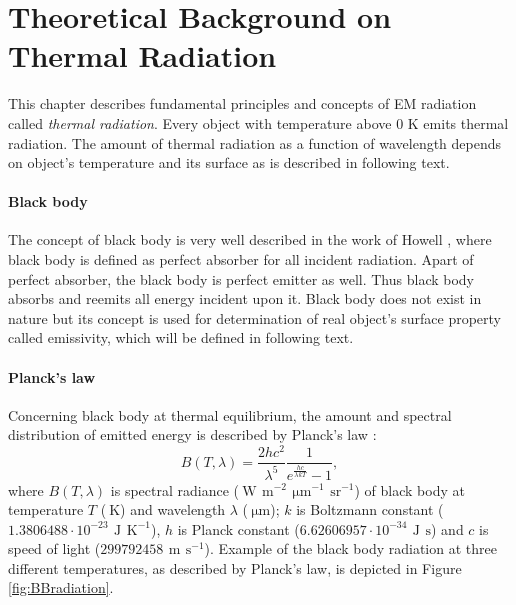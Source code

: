 \chapter{Theoretical Background on Thermal Radiation}
\label{chap:TheoreticalBackground}

This chapter describes fundamental principles and concepts of EM radiation called \textit{thermal radiation}. Every object with temperature above 0 K emits thermal radiation. The amount of thermal radiation as a function of wavelength depends on object's temperature and its surface as is described in following text.

\subsubsection*{Black body}
The concept of black body is very well described in the work of Howell \cite{H11}, where black body is defined as perfect absorber for all incident radiation. Apart of perfect absorber, the black body is perfect emitter as well. Thus black body absorbs and reemits all energy incident upon it. Black body does not exist in nature but its concept is used for determination of real object's surface property called emissivity, which will be defined in following text. 

\subsubsection*{Planck's law}
Concerning black body at thermal equilibrium, the amount and spectral distribution of emitted energy is described by Planck’s law \cite{P00}:
$$B(T,\lambda) = \frac{2hc^2}{\lambda^5}\frac{1}{e^{\frac{hc}{\lambda k T}}-1},$$
where $B(T,\lambda)$ is spectral radiance ($\SI{}{\watt}\,\SI{}{\meter}^{-2}\,\SI{}{\micro\meter}^{-1}\,\SI{}{\steradian}^{-1}$) of black body at temperature $T$ ($\SI{}{\kelvin}$) and wavelength $\lambda$ ($\SI{}{\micro\meter}$); $k$ is Boltzmann constant ($1.3806488\cdot10^{-23}\,\SI{}{\joule}\,\SI{}{\kelvin}^{-1}$), $h$ is Planck constant ($6.62606957\cdot10^{-34}\,\SI{}{\joule}\,\SI{}{\second}$) and $c$ is speed of light ($299792458\,\SI{}{\meter}\,\SI{}{\second}^{-1}$). Example of the black body radiation at three different temperatures, as described by Planck's law, is depicted in Figure \ref{fig:BBradiation}.


